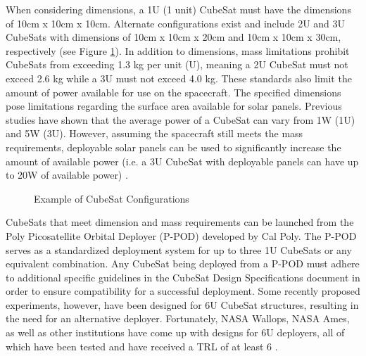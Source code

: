 \documentclass[11pt]{article}
\begin{document}
When considering dimensions, a 1U (1 unit) CubeSat must have the dimensions of 10cm x 10cm x 10cm.  Alternate configurations exist and include 2U and 3U CubeSats with dimensions of 10cm x 10cm x 20cm and 10cm x 10cm x 30cm, respectively (see Figure \ref{config}).  In addition to dimensions, mass limitations prohibit CubeSats from exceeding 1.3 kg per unit (U), meaning a 2U CubeSat must not exceed 2.6 kg while a 3U must not exceed 4.0 kg.  These standards also limit the amount of power available for use on the spacecraft.  The specified dimensions pose limitations regarding the surface area available for solar panels.  Previous studies have shown that the average power of a CubeSat can vary from 1W (1U) and 5W (3U).  However, assuming the spacecraft still meets the mass requirements, deployable solar panels can be used to significantly increase the amount of available power (i.e. a 3U CubeSat with deployable panels can have up to 20W of available power) \cite{ClydeSpace}. 

\begin{figure}[ht!]
\centering
{}
\caption{Example of CubeSat Configurations\cite{configimage}}
\label{config}
\end{figure}

CubeSats that meet dimension and mass requirements can be launched from the Poly Picosatellite Orbital Deployer (P-POD) developed by Cal Poly.  The P-POD serves as a standardized deployment system for up to three 1U CubeSats or any equivalent combination.  Any CubeSat being deployed from a P-POD must adhere to additional specific guidelines in the CubeSat Design Specifications document in order to ensure compatibility for a successful deployment.  Some recently proposed experiments, however, have been designed for 6U CubeSat structures, resulting in the need for an alternative deployer.  Fortunately, NASA Wallops, NASA Ames, as well as other institutions have come up with designs for 6U deployers, all of which have been tested and have received a TRL of at least 6 \cite{SmSCTech}.
\end{document}
